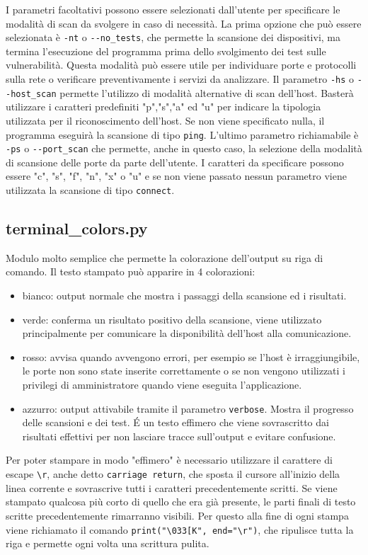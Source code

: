 \documentclass[12pt]{report}
\begin{document}
I parametri facoltativi possono essere selezionati dall'utente per specificare le modalità di scan da svolgere in caso di necessità. La prima opzione che può essere selezionata è \lstinline{-nt} o \lstinline{--no_tests}, che permette la scansione dei dispositivi, ma termina l'esecuzione del programma prima dello svolgimento dei test sulle vulnerabilità. Questa modalità può essere utile per individuare porte e protocolli sulla rete o verificare preventivamente i servizi da analizzare. Il parametro \lstinline{-hs} o \lstinline{--host_scan} permette l'utilizzo di modalità alternative di scan dell'host. Basterà utilizzare i caratteri predefiniti "p","s","a" ed "u" per indicare la tipologia utilizzata per il riconoscimento dell'host. Se non viene specificato nulla, il programma eseguirà la scansione di tipo \lstinline{ping}. L'ultimo parametro richiamabile è \lstinline{-ps} o \lstinline{--port_scan} che permette, anche in questo caso, la selezione della modalità di scansione delle porte da parte dell'utente. I caratteri da specificare possono essere "c", "s", "f", "n", "x" o "u" e se non viene passato nessun parametro viene utilizzata la scansione di tipo \lstinline{connect}.

\subsection{terminal\_colors.py}

Modulo molto semplice che permette la colorazione dell'output su riga di comando. Il testo stampato può apparire in 4 colorazioni:
\begin{itemize}
    \item bianco: output normale che mostra i passaggi della scansione ed i risultati.
    \item verde: conferma un risultato positivo della scansione, viene utilizzato principalmente per comunicare la disponibilità dell'host alla comunicazione.
    \item rosso: avvisa quando avvengono errori, per esempio se l'host è irraggiungibile, le porte non sono state inserite correttamente o se non vengono utilizzati i privilegi di amministratore quando viene eseguita l'applicazione.
    \item azzurro: output attivabile tramite il parametro \lstinline{verbose}. Mostra il progresso delle scansioni e dei test. \'{E} un testo effimero che viene sovrascritto dai risultati effettivi per non lasciare tracce sull'output e evitare confusione.
\end{itemize}
Per poter stampare in modo "effimero" è necessario utilizzare il carattere di escape \lstinline{\r}, anche detto \lstinline{carriage return}, che sposta il cursore all'inizio della linea corrente e sovrascrive tutti i caratteri precedentemente scritti. Se viene stampato qualcosa più corto di quello che era già presente, le parti finali di testo scritte precedentemente rimarranno visibili. Per questo alla fine di ogni stampa viene richiamato il comando \lstinline{print("\033[K", end="\r")}, che ripulisce tutta la riga e permette ogni volta una scrittura pulita.
\end{document}
